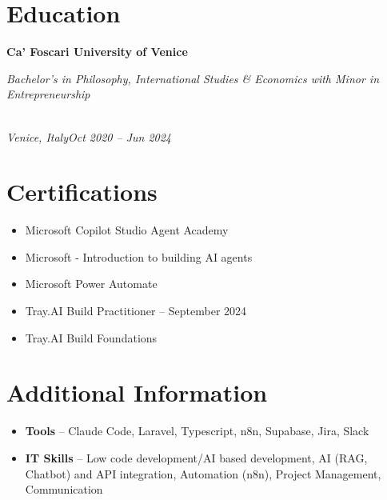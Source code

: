 \documentclass[a4paper,10pt]{article}
\newcommand{\role}[4]{\vspace{3pt}\noindent\hspace{0.6em}\parbox[t]{0.38\textwidth}{\raggedright\textbf{#1}}\hfill\parbox[t]{0.58\textwidth}{\raggedleft\textit{#2}}\\{\textit{#3}\hfill\textit{#4}}\vspace{1pt}}
\begin{document}
\section{Education}
\role{Ca' Foscari University of Venice}{Bachelor's in Philosophy, International Studies \& Economics with Minor in Entrepreneurship}{Venice, Italy}{Oct 2020 -- Jun 2024}

\section{Certifications}
\begin{itemize}
\item Microsoft Copilot Studio Agent Academy
\item Microsoft - Introduction to building AI agents
\item Microsoft Power Automate
\item Tray.AI Build Practitioner -- September 2024
\item Tray.AI Build Foundations
\end{itemize}

\section{Additional Information}
\begin{itemize}
\item \textbf{Tools} -- Claude Code, Laravel, Typescript, n8n, Supabase, Jira, Slack
\item \textbf{IT Skills} -- Low code development/AI based development, AI (RAG, Chatbot) and API integration, Automation (n8n), Project Management, Communication
\end{itemize}
\end{document}

